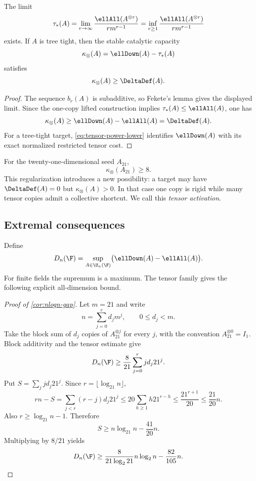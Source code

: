 \begin{proposition}\label{prop:stable-tensor-length}
The limit
\[
\tau_*(A)
=
\lim_{r\to\infty}
\frac{\ellAll(A^{\otimes r})}{r m^{r-1}}
=
\inf_{r\ge1}
\frac{\ellAll(A^{\otimes r})}{r m^{r-1}}
\]
exists.  If $A$ is tree tight, then the stable catalytic capacity
\[
\kappa_\otimes(A)
=
\ellDown(A)-\tau_*(A)
\]
satisfies
\[
\kappa_\otimes(A)\ge\DeltaDef(A).
\]
\end{proposition}

\begin{proof}
The sequence $b_r(A)$ is subadditive, so Fekete's lemma gives the displayed limit.  Since the one-copy lifted construction implies $\tau_*(A)\le\ellAll(A)$, one has
\[
\kappa_\otimes(A)
\ge
\ellDown(A)-\ellAll(A)
=
\DeltaDef(A).
\]
For a tree-tight target, \cref{eq:tensor-power-lower} identifies $\ellDown(A)$ with its exact normalized restricted tensor cost.
\end{proof}

For the twenty-one-dimensional seed $A_{21}$,
\[
\kappa_\otimes(A_{21})\ge8.
\]
This regularization introduces a new possibility: a target may have $\DeltaDef(A)=0$ but $\kappa_\otimes(A)>0$.  In that case one copy is rigid while many tensor copies admit a collective shortcut.  We call this \emph{tensor activation}.

\subsection{Extremal consequences}

Define
\[
D_n(\F)
=
\sup_{A\in\U_n(\F)}
\bigl(\ellDown(A)-\ellAll(A)\bigr).
\]
For finite fields the supremum is a maximum.  The tensor family gives the following explicit all-dimension bound.

\begin{proof}[Proof of \cref{cor:nlogn-gap}]
Let $m=21$ and write
\[
n=\sum_{j=0}^{r}d_jm^j,
\qquad
0\le d_j<m.
\]
Take the block sum of $d_j$ copies of $A_{21}^{\otimes j}$ for every $j$, with the convention $A_{21}^{\otimes0}=I_1$.  Block additivity and the tensor estimate give
\[
D_n(\F)
\ge
\frac{8}{21}
\sum_{j=0}^{r}j d_j21^j.
\]
Put $S=\sum_j j d_j21^j$.  Since $r=\lfloor\log_{21}n\rfloor$,
\[
r n-S
=
\sum_{j<r}(r-j)d_j21^j
\le
20\sum_{h\ge1}h21^{r-h}
\le
\frac{21^{r+1}}{20}
\le
\frac{21}{20}n.
\]
Also $r\ge\log_{21}n-1$.  Therefore
\[
S\ge n\log_{21}n-\frac{41}{20}n.
\]
Multiplying by $8/21$ yields
\[
D_n(\F)
\ge
\frac{8}{21\log_2 21}n\log_2n
-
\frac{82}{105}n.
\]
\end{proof}

